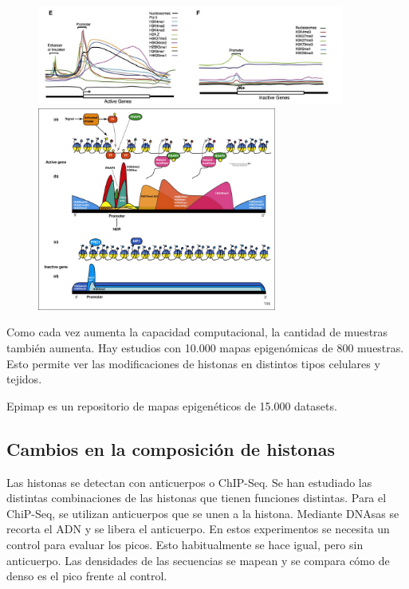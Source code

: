 \begin{figure}[h]
\centering
\includegraphics[width = 0.9\textwidth]{figs/histone-modification.png}
\includegraphics[width = 0.7\textwidth]{figs/1-s2.0-S0968000410000940-gr1.jpg}
\end{figure}

Como cada vez aumenta la capacidad computacional, la cantidad de muestras también aumenta. Hay estudios con 10.000 mapas epigenómicas de 800 muestras. Esto permite ver las modificaciones de histonas en distintos tipos celulares y tejidos. 

Epimap es un repositorio de mapas epigenéticos de 15.000 datasets. 

\subsection{Cambios en la composición de histonas}
Las histonas se detectan con anticuerpos o ChIP-Seq. Se han estudiado las distintas combinaciones de las histonas que tienen funciones distintas. Para el ChiP-Seq, se utilizan anticuerpos que se unen a la histona. Mediante DNAsas se recorta el ADN y se libera el anticuerpo. En estos experimentos se necesita un control para evaluar los picos. Esto habitualmente se hace igual, pero sin anticuerpo. Las densidades de las secuencias se mapean y se compara cómo de denso es el pico frente al control. 


